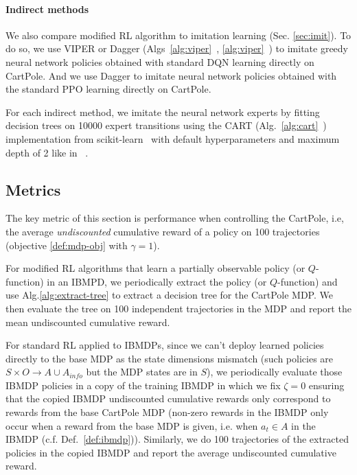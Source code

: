 \paragraph{Indirect methods} We also compare modified RL algorithm to imitation learning (Sec. \ref{sec:imit}).
To do so, we use VIPER or Dagger (Algs~\ref{alg:viper}~\cite{dagger}, \ref{alg:viper}~\cite{viper}) to imitate greedy neural network policies obtained with standard DQN learning directly on CartPole.
And we use Dagger to imitate neural network policies obtained with the standard PPO learning directly on CartPole. 

For each indirect method, we imitate the neural network experts by fitting decision trees on 10000 expert transitions using the CART (Alg.~\ref{alg:cart}~\cite{breiman1984classification}) implementation from scikit-learn~\cite{scikit-learn} with default hyperparameters and maximum depth of 2 like in ~\cite{topin2021iterative}.
    
\subsection{Metrics}
The key metric of this section is performance when controlling the CartPole, i.e, the average \textit{undiscounted} cumulative reward of a policy on 100 trajectories (objective \ref{def:mdp-obj} with $\gamma=1$).

For modified RL algorithms that learn a partially observable policy (or $Q$-function) in an IBMPD, we periodically extract the policy (or $Q$-function) and use Alg.\ref{alg:extract-tree} to extract a decision tree for the CartPole MDP. 
We then evaluate the tree on 100 independent trajectories in the MDP and report the mean undiscounted cumulative reward.

For standard RL applied to IBMDPs, since we can't deploy learned policies directly to the base MDP as the state dimensions mismatch (such policies are $S\times O\rightarrow A \cup A_{info}$ but the MDP states are in $S$), we periodically evaluate those IBMDP policies in a copy of the training IBMDP in which we fix $\zeta=0$ ensuring that the copied IBMDP undiscounted cumulative rewards only correspond to rewards from the base CartPole MDP (non-zero rewards in the IBMDP only occur when a reward from the base MDP is given, i.e. when $a_t\in A$ in the IBMDP (c.f. Def.~\ref{def:ibmdp})).
Similarly, we do 100 trajectories of the extracted policies in the copied IBMDP and report the average undiscounted cumulative reward.

